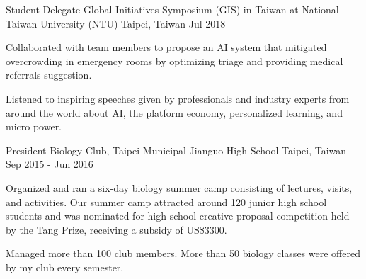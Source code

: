 \begin{cventries}
  \cventry
    {Student Delegate} %
    {Global Initiatives Symposium (GIS) in Taiwan at National Taiwan University (NTU)} %
    {Taipei, Taiwan} %
    {Jul 2018} %
    {
	\begin{cvitems} %
      	\item Collaborated with team members to propose an AI system that mitigated overcrowding in emergency rooms by optimizing triage and providing medical referrals suggestion. 
      	\item Listened to inspiring speeches given by professionals and industry experts from around the world about AI, the platform economy, personalized learning, and micro power.
	\end{cvitems}
    }  
  
  \cventry
    {President} %
    {Biology Club, Taipei Municipal Jianguo High School} %
    {Taipei, Taiwan} %
    {Sep 2015 - Jun 2016} %
    {
	\begin{cvitems} %
      	\item Organized and ran a six-day biology summer camp consisting of lectures, visits, and activities. Our summer camp attracted around 120 junior high school students and was nominated for high school creative proposal competition held by the Tang Prize, receiving a subsidy of US\$3300. 
      	\item Managed more than 100 club members. More than 50 biology classes were offered by my club every semester.
	\end{cvitems}
    }

\end{cventries}
